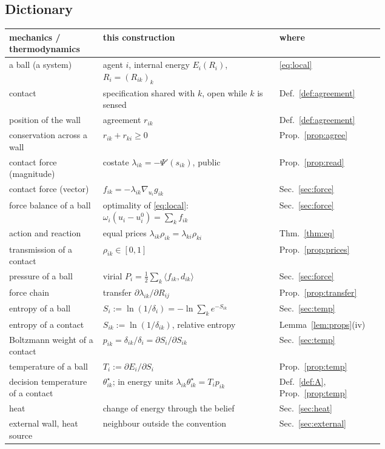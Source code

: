 \documentclass[11pt]{article}
\theoremstyle{definition}
\theoremstyle{remark}
\begin{document}
\subsection{Dictionary}
\begin{center}
\small
\begin{tabular}{>{\raggedright}p{0.25\linewidth}>{\raggedright}p{0.47\linewidth}l}
\toprule
mechanics / thermodynamics & this construction & where\tabularnewline
\midrule
a ball (a system) & agent $i$, internal energy $E_i(R_i)$, $R_i=(R_{ik})_k$ & \eqref{eq:local}\tabularnewline
contact & specification shared with $k$, open while $k$ is sensed & Def.~\ref{def:agreement}\tabularnewline
position of the wall & agreement $r_{ik}$ & Def.~\ref{def:agreement}\tabularnewline
conservation across a wall & $r_{ik}+r_{ki}\ge0$ & Prop.~\ref{prop:agree}\tabularnewline
contact force (magnitude) & costate $\lambda_{ik}=-\Psi'(s_{ik})$, public & Prop.~\ref{prop:read}\tabularnewline
contact force (vector) & $f_{ik}=-\lambda_{ik}\nabla_{u_i}g_{ik}$ & Sec.~\ref{sec:force}\tabularnewline
force balance of a ball & optimality of \eqref{eq:local}: $\omega_i(u_i-u_i^0)=\sum_kf_{ik}$ & Sec.~\ref{sec:force}\tabularnewline
action and reaction & equal prices $\lambda_{ik}\rho_{ik}=\lambda_{ki}\rho_{ki}$ & Thm.~\ref{thm:eq}\tabularnewline
transmission of a contact & $\rho_{ik}\in[0,1]$ & Prop.~\ref{prop:prices}\tabularnewline
pressure of a ball & virial $P_i=\tfrac12\sum_k\langle f_{ik},d_{ik}\rangle$ & Sec.~\ref{sec:force}\tabularnewline
force chain & transfer $\partial\lambda_{ik}/\partial R_{ij}$ & Prop.~\ref{prop:transfer}\tabularnewline
entropy of a ball & $S_i:=\ln(1/\delta_i)=-\ln\sum_ke^{-S_{ik}}$ & Sec.~\ref{sec:temp}\tabularnewline
entropy of a contact & $S_{ik}:=\ln(1/\delta_{ik})$, relative entropy & Lemma~\ref{lem:props}(iv)\tabularnewline
Boltzmann weight of a contact & $p_{ik}=\delta_{ik}/\delta_i=\partial S_i/\partial S_{ik}$ & Sec.~\ref{sec:temp}\tabularnewline
temperature of a ball & $T_i:=\partial E_i/\partial S_i$ & Prop.~\ref{prop:temp}\tabularnewline
decision temperature of a contact & $\theta^\star_{ik}$; in energy units $\lambda_{ik}\theta^\star_{ik}=T_ip_{ik}$ & Def.~\ref{def:A}, Prop.~\ref{prop:temp}\tabularnewline
heat & change of energy through the belief & Sec.~\ref{sec:heat}\tabularnewline
external wall, heat source & neighbour outside the convention & Sec.~\ref{sec:external}\tabularnewline
\bottomrule
\end{tabular}
\end{center}
\end{document}
